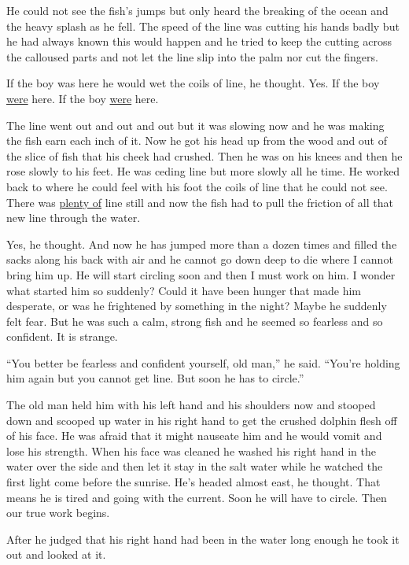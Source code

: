\documentclass[fontset=ubuntu,zihao=-4]{ctexrep}
\begin{document}
He could not see the fish's jumps but only heard the breaking of the ocean
and the heavy \gls{splash} as he fell. The speed of the line was cutting his
hands badly but he had always known this would happen and he tried to keep
the cutting across the \gls{calloused} parts and not let the line slip into
the \gls{palm} nor cut the fingers.

If the boy was here he would wet the coils of line, he thought. Yes. If the
boy \uline{were} here. If the boy \uline{were} here.

The line went out and out and out but it was slowing now and he was making
the fish earn each inch of it. Now he got his head up from the wood and out
of the slice of fish that his cheek had \gls{crushed}. Then he was on his
knees and then he rose slowly to his feet. He was \gls{ceding} line but more
slowly all he time. He worked back to where he could feel with his foot the
coils of line that he could not see. There was \uline{plenty of} line still and now
the fish had to pull the \gls{friction} of all that new line through the water.

Yes, he thought. And now he has jumped more than a \gls{dozen} times and
filled the sacks along his back with air and he cannot go down deep to die
where I cannot bring him up. He will start circling soon and then I must
work on him. I wonder what started him so suddenly? Could it have been
hunger that made him desperate, or was he \gls{frightened} by something in
the night? Maybe he suddenly felt fear. But he was such a calm, strong fish
and he seemed so \gls{fearless} and so confident. It is strange.

``You better be fearless and confident yourself, old man,'' he said.
``You're holding him again but you cannot get line. But soon he has to
circle.''

The old man held him with his left hand and his shoulders now and stooped
down and \gls{scoop}ed up water in his right hand to get the crushed dolphin
flesh off of his face. He was afraid that it might \gls{nauseate} him and he
would vomit and lose his strength. When his face was cleaned he washed his
right hand in the water over the side and then let it stay in the salt water
while he watched the first light come before the sunrise. He's headed almost
east, he thought. That means he is tired and going with the current. Soon he
will have to circle. Then our true work begins.

After he judged that his right hand had been in the water long enough he
took it out and looked at it.
\end{document}
